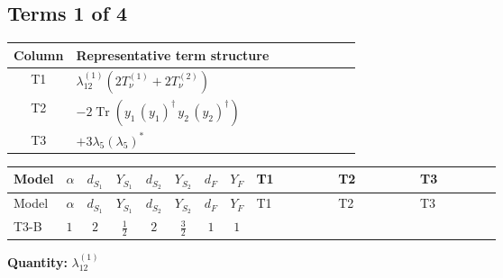 \documentclass[8pt]{article}
\begin{document}
\begin{landscape}
\subsection*{Terms 1 of 4}
\begin{center}
\begin{tabular}{@{}c >{\raggedright\arraybackslash}p{0.82\linewidth}@{}}
\toprule
Column & Representative term structure \\
\midrule
T1 & \(\displaystyle {\lambda_{12}^{(1)}} (2 T_{\nu}^{(1)}+2 T_{\nu}^{(2)})\) \\
\midrule
T2 & \(\displaystyle -2 \operatorname{Tr}\!\left({y_1}\,\left({y_1}\right)^{\dagger}\,{y_2}\,\left({y_2}\right)^{\dagger}\right)\) \\
\midrule
T3 & \(\displaystyle +3 {\lambda_5} \left({\lambda_5}\right)^{*}\) \\
\midrule
\bottomrule
\end{tabular}
\end{center}
\smallskip
\tiny
\begin{longtable}{@{}llcccccc >{\raggedright\arraybackslash}p{0.21\linewidth} >{\raggedright\arraybackslash}p{0.21\linewidth} >{\raggedright\arraybackslash}p{0.21\linewidth}@{}}
\toprule
Model & $\alpha$ & $d_{S_1}$ & $Y_{S_1}$ & $d_{S_2}$ & $Y_{S_2}$ & $d_F$ & $Y_F$ & T1 & T2 & T3 \\
\midrule
\endfirsthead
\toprule
Model & $\alpha$ & $d_{S_1}$ & $Y_{S_1}$ & $d_{S_2}$ & $Y_{S_2}$ & $d_F$ & $Y_F$ & T1 & T2 & T3 \\
\midrule
\endhead
T3-B & $1$ & $2$ & $\frac{1}{2}$ & $2$ & $\frac{3}{2}$ & $1$ & $1$ & \scriptsize\adjustbox{max width=\linewidth}{$\begin{gathered} {\lambda_{12}^{(1)}} (2 T_{\nu}^{(1)}+2 T_{\nu}^{(2)})\end{gathered}$} & \scriptsize\adjustbox{max width=\linewidth}{$\begin{gathered} -2 \operatorname{Tr}\!\left({y_1}\,\left({y_1}\right)^{\dagger}\,{y_2}\,\left({y_2}\right)^{\dagger}\right)\end{gathered}$} & \scriptsize\adjustbox{max width=\linewidth}{$\begin{gathered} +3 {\lambda_5} \left({\lambda_5}\right)^{*}\end{gathered}$} \\
\midrule
\bottomrule
\end{longtable}
\clearpage
\noindent\textbf{Quantity: }$\lambda_{12}^{(1)}$\par\smallskip

\end{landscape}
\end{document}
